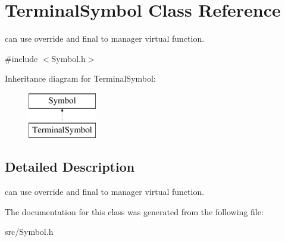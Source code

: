 \hypertarget{class_terminal_symbol}{}\section{Terminal\+Symbol Class Reference}
\label{class_terminal_symbol}


can use override and final to manager virtual function.  




{\ttfamily \#include $<$Symbol.\+h$>$}

Inheritance diagram for Terminal\+Symbol\+:\begin{figure}[H]
\begin{center}
\leavevmode
\includegraphics[height=2.000000cm]{class_terminal_symbol}
\end{center}
\end{figure}


\subsection{Detailed Description}
can use override and final to manager virtual function. 

The documentation for this class was generated from the following file\+:\begin{DoxyCompactItemize}
\item 
src/Symbol.\+h\end{DoxyCompactItemize}
